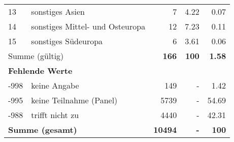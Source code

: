 \begin{longtable}{lXrrr}
     13 &
     \multicolumn{1}{X}{ sonstiges Asien   } &


       \num{7} &
       \num[round-mode=places,round-precision=2]{4.22} &
         \num[round-mode=places,round-precision=2]{0.07} \\

     14 &
     \multicolumn{1}{X}{ sonstiges Mittel- und Osteuropa   } &


       \num{12} &
       \num[round-mode=places,round-precision=2]{7.23} &
         \num[round-mode=places,round-precision=2]{0.11} \\

     15 &
     \multicolumn{1}{X}{ sonstiges Südeuropa   } &


       \num{6} &
       \num[round-mode=places,round-precision=2]{3.61} &
         \num[round-mode=places,round-precision=2]{0.06} \\
     \midrule
     \multicolumn{2}{l}{Summe (gültig)} &
       \textbf{\num{166}} &
     \textbf{\num{100}} &
       \textbf{\num[round-mode=places,round-precision=2]{1.58}} \\
     \multicolumn{5}{l}{\textbf{Fehlende Werte}}\\
       -998 &
       keine Angabe &
         \num{149} &
        - &
         \num[round-mode=places,round-precision=2]{1.42} \\
       -995 &
       keine Teilnahme (Panel) &
         \num{5739} &
        - &
         \num[round-mode=places,round-precision=2]{54.69} \\
       -988 &
       trifft nicht zu &
         \num{4440} &
        - &
         \num[round-mode=places,round-precision=2]{42.31} \\
     \midrule
     \multicolumn{2}{l}{\textbf{Summe (gesamt)}} &
          \textbf{\num{10494}} &
        \textbf{-} &
        \textbf{\num{100}} \\
     \bottomrule
     \end{longtable}
     
